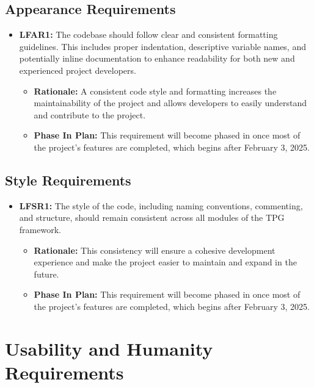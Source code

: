 \documentclass[12pt]{article}
\begin{document}
\subsection{Appearance Requirements}

\begin{itemize}
  \item \label{LFAR1} \textbf{LFAR1:}  The codebase should follow clear and consistent formatting guidelines. This includes proper indentation, descriptive variable names, and potentially inline documentation to enhance readability for both new and experienced project developers.
      \begin{itemize}
        \item \textbf{Rationale:} A consistent code style and formatting increases the maintainability of the project and allows developers to easily understand and contribute to the project. 
        \item \textbf{Phase In Plan:} This requirement will become phased in once most of the project’s features are completed, which begins after February 3, 2025. 

      \end{itemize}
\end{itemize}


\subsection{Style Requirements}


\begin{itemize}
  \item \label{LFSR1} \textbf{LFSR1:}  The style of the code, including naming conventions, commenting, and structure, should remain consistent across all modules of the TPG framework.

      \begin{itemize}
        \item \textbf{Rationale:} This consistency will ensure a cohesive development experience and make the project easier to maintain and expand in the future.
        \item \textbf{Phase In Plan:} This requirement will become phased in once most of the project’s features are completed, which begins after February 3, 2025. 

      \end{itemize}
\end{itemize}


\section{Usability and Humanity Requirements}
\end{document}
